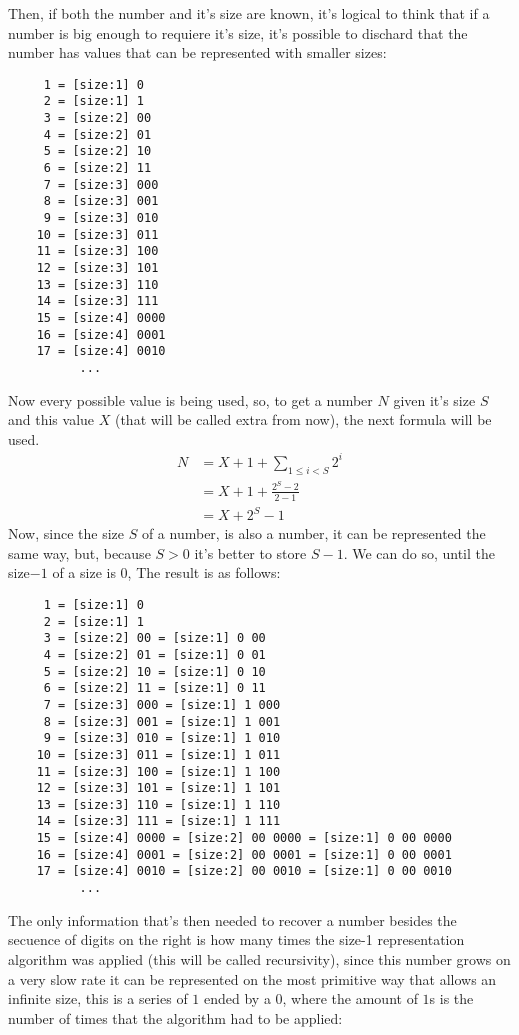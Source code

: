 \documentclass[a4paper,11pt]{article}
\begin{document}
Then, if both the number and it's size are known, it's logical to think that if a number is big enough to requiere it's size, it's possible to dischard that the number has values that can be represented with smaller sizes:
\begin{center} \begin{lstlisting}
	 1 = [size:1] 0
	 2 = [size:1] 1
	 3 = [size:2] 00
	 4 = [size:2] 01
	 5 = [size:2] 10
	 6 = [size:2] 11
	 7 = [size:3] 000
	 8 = [size:3] 001
	 9 = [size:3] 010
	10 = [size:3] 011
	11 = [size:3] 100
	12 = [size:3] 101
	13 = [size:3] 110
	14 = [size:3] 111
	15 = [size:4] 0000
	16 = [size:4] 0001
	17 = [size:4] 0010
	      ...
\end{lstlisting} \end{center}
Now every possible value is being used, so, to get a number $N$ given it's size $S$ and this value $X$ (that will be called extra from now), the next formula will be used.
\begin{align*}
	N&= X +1 + \sum_{1\leq i < S}{2^i} \\
	&= X+1+ \frac{2^{S}-2}{2-1} \\
	&= X+2^{S}-1
\end{align*}
Now, since the size $S$ of a number, is also a number, it can be represented the same way, but, because $S>0$ it's better to store $S-1$. We can do so, until the size$-1$ of a size is $0$, The result is as follows:
\begin{center} \begin{lstlisting}
	 1 = [size:1] 0
	 2 = [size:1] 1
	 3 = [size:2] 00 = [size:1] 0 00
	 4 = [size:2] 01 = [size:1] 0 01
	 5 = [size:2] 10 = [size:1] 0 10
	 6 = [size:2] 11 = [size:1] 0 11
	 7 = [size:3] 000 = [size:1] 1 000
	 8 = [size:3] 001 = [size:1] 1 001
	 9 = [size:3] 010 = [size:1] 1 010
	10 = [size:3] 011 = [size:1] 1 011
	11 = [size:3] 100 = [size:1] 1 100
	12 = [size:3] 101 = [size:1] 1 101
	13 = [size:3] 110 = [size:1] 1 110
	14 = [size:3] 111 = [size:1] 1 111
	15 = [size:4] 0000 = [size:2] 00 0000 = [size:1] 0 00 0000
	16 = [size:4] 0001 = [size:2] 00 0001 = [size:1] 0 00 0001
	17 = [size:4] 0010 = [size:2] 00 0010 = [size:1] 0 00 0010
	      ...	
\end{lstlisting} \end{center}
The only information that's then needed to recover a number besides the secuence of digits on the right is how many times the size-1 representation algorithm was applied (this will be called recursivity), since this number grows on a very slow rate it can be represented on the most primitive way that allows an infinite size, this is a series of $1$ ended by a $0$, where the amount of $1$s is the number of times that the algorithm had to be applied:
\end{document}
